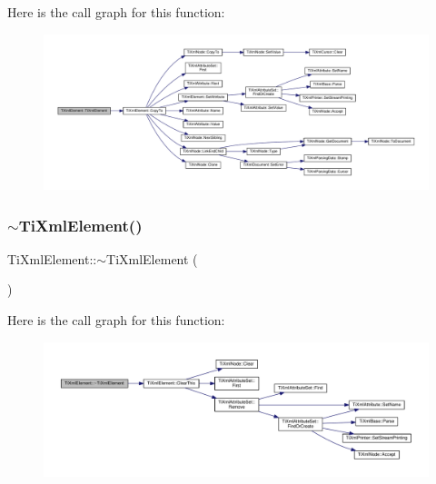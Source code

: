 Here is the call graph for this function\+:
\nopagebreak
\begin{figure}[H]
\begin{center}
\leavevmode
\includegraphics[width=350pt]{class_ti_xml_element_a1ca4465f3c2eac6a60e641cd7f1d9f7e_cgraph}
\end{center}
\end{figure}
\mbox{\label{class_ti_xml_element_aa049a47c5081c0d021968666360da261}} 
\subsubsection{\texorpdfstring{$\sim$\+Ti\+Xml\+Element()}{~TiXmlElement()}}
{\footnotesize\ttfamily Ti\+Xml\+Element\+::$\sim$\+Ti\+Xml\+Element (\begin{DoxyParamCaption}{ }\end{DoxyParamCaption})\hspace{0.3cm}{\ttfamily [virtual]}}

Here is the call graph for this function\+:
\nopagebreak
\begin{figure}[H]
\begin{center}
\leavevmode
\includegraphics[width=350pt]{class_ti_xml_element_aa049a47c5081c0d021968666360da261_cgraph}
\end{center}
\end{figure}


